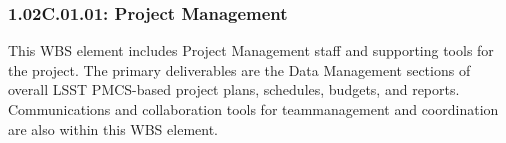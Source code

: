 \subsubsection{1.02C.01.01: Project Management}

This WBS element includes Project Management staff and supporting tools for
the project. The primary deliverables are the Data Management sections of
overall LSST PMCS-based project plans, schedules, budgets, and reports.
Communications and collaboration tools for teammanagement and coordination are
also within this WBS element.
